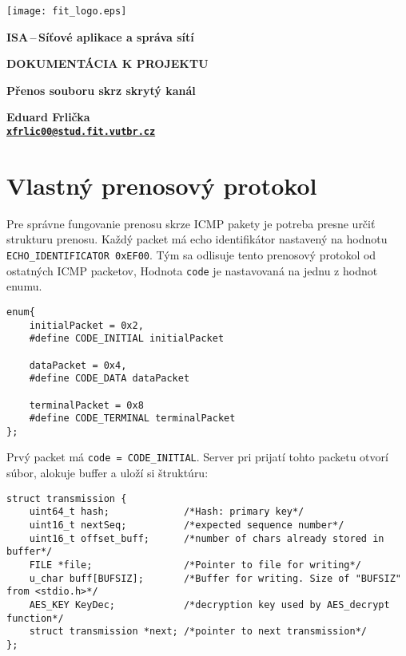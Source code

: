 \documentclass{article}
\renewcommand{\tt}[1]{\texttt{#1}}
\begin{document}
\begin{titlepage}
    \begin{center}
    
    \texttt{[image: fit\_logo.eps]}
    
    \vspace{6cm}
    
    \huge{\textbf{ISA\,--\,Síťové aplikace a správa sítí}}
    \vspace{0.5cm}
    
    \Large{\textbf{DOKUMENTÁCIA K PROJEKTU}}
    \vspace{0.5cm}
    
    \Large{\textbf{Přenos souboru skrz skrytý kanál}}
    \vspace{2cm}
    
    \large{\textbf{Eduard Frlička \\ \texttt{\normalsize{\href{mailto:xfrlic00@stud.fit.vutbr.cz}{xfrlic00@stud.fit.vutbr.cz}}}}}
    \vspace{0.5cm}
    
    \vspace{1cm}
    
    
    \end{center}
    
    \end{titlepage}


\section{Vlastný prenosový protokol}
Pre správne fungovanie prenosu skrze ICMP pakety je potreba presne určiť strukturu prenosu.
Každý packet má echo identifikátor nastavený na hodnotu \tt{ECHO\_IDENTIFICATOR 0xEF00}.
Tým sa odlisuje tento prenosový protokol od ostatných ICMP packetov,
Hodnota \tt{code} je nastavovaná na jednu z hodnot enumu.

\begin{verbatim}
enum{
    initialPacket = 0x2,
    #define CODE_INITIAL initialPacket

    dataPacket = 0x4,
    #define CODE_DATA dataPacket
    
    terminalPacket = 0x8
    #define CODE_TERMINAL terminalPacket
};
\end{verbatim}

Prvý packet má \tt{code = CODE\_INITIAL}. Server pri prijatí tohto packetu otvorí súbor, alokuje buffer a uloží si štruktúru:

\begin{verbatim}
struct transmission {
    uint64_t hash;             /*Hash: primary key*/
    uint16_t nextSeq;          /*expected sequence number*/
    uint16_t offset_buff;      /*number of chars already stored in buffer*/
    FILE *file;                /*Pointer to file for writing*/
    u_char buff[BUFSIZ];       /*Buffer for writing. Size of "BUFSIZ" from <stdio.h>*/
    AES_KEY KeyDec;            /*decryption key used by AES_decrypt function*/
    struct transmission *next; /*pointer to next transmission*/
};

\end{verbatim}
\end{document}
